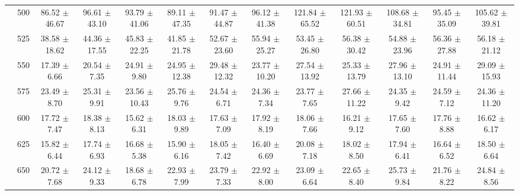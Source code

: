 \begin{table}[h]
{\begin{tabular}{
        ccccccccccccc}
 & 500& 86.52 $\pm$ 46.67& 96.61 $\pm$ 43.10& 93.79 $\pm$ 41.06& 89.11 $\pm$ 47.35& 91.47 $\pm$ 44.87& 96.12 $\pm$ 41.38& 121.84 $\pm$ 65.52& 121.93 $\pm$ 60.51& 108.68 $\pm$ 34.81& 95.45 $\pm$ 35.09& 105.62 $\pm$ 39.81 \\ 
 & 525& 38.58 $\pm$ 18.62& 44.36 $\pm$ 17.55& 45.83 $\pm$ 22.25& 41.85 $\pm$ 21.78& 52.67 $\pm$ 23.60& 55.94 $\pm$ 25.27& 53.45 $\pm$ 26.80& 56.38 $\pm$ 30.42& 54.88 $\pm$ 23.96& 56.36 $\pm$ 27.88& 56.18 $\pm$ 21.12 \\ 
 & 550& 17.39 $\pm$ 6.66& 20.54 $\pm$ 7.35& 24.91 $\pm$ 9.80& 24.95 $\pm$ 12.38& 29.48 $\pm$ 12.32& 23.77 $\pm$ 10.20& 27.54 $\pm$ 13.92& 25.33 $\pm$ 13.79& 27.96 $\pm$ 13.10& 24.91 $\pm$ 11.44& 29.09 $\pm$ 15.93 \\ 
 & 575& 23.49 $\pm$ 8.70& 25.31 $\pm$ 9.91& 23.56 $\pm$ 10.43& 25.76 $\pm$ 9.76& 24.54 $\pm$ 6.71& 24.36 $\pm$ 7.34& 23.77 $\pm$ 7.65& 27.66 $\pm$ 11.22& 24.35 $\pm$ 9.42& 24.59 $\pm$ 7.12& 24.36 $\pm$ 11.20 \\ 
 & 600& 17.72 $\pm$ 7.47& 18.38 $\pm$ 8.13& 15.62 $\pm$ 6.31& 18.03 $\pm$ 9.89& 17.63 $\pm$ 7.09& 17.92 $\pm$ 8.19& 18.06 $\pm$ 7.66& 16.21 $\pm$ 9.12& 17.65 $\pm$ 7.60& 17.76 $\pm$ 8.88& 16.62 $\pm$ 6.17 \\ 
 & 625& 15.82 $\pm$ 6.44& 17.74 $\pm$ 6.93& 16.68 $\pm$ 5.38& 15.90 $\pm$ 6.16& 18.05 $\pm$ 7.42& 16.40 $\pm$ 6.69& 20.08 $\pm$ 7.18& 18.02 $\pm$ 8.50& 17.94 $\pm$ 6.41& 16.64 $\pm$ 6.52& 18.50 $\pm$ 6.64 \\ 
 & 650& 20.72 $\pm$ 7.68& 24.12 $\pm$ 9.33& 18.68 $\pm$ 6.78& 22.93 $\pm$ 7.99& 23.79 $\pm$ 7.33& 22.92 $\pm$ 8.00& 23.09 $\pm$ 6.64& 22.65 $\pm$ 8.40& 25.73 $\pm$ 9.84& 21.76 $\pm$ 8.22& 24.84 $\pm$ 8.56 \\ \hline 

        \end{tabular}%
        }

        \end{table}
        
